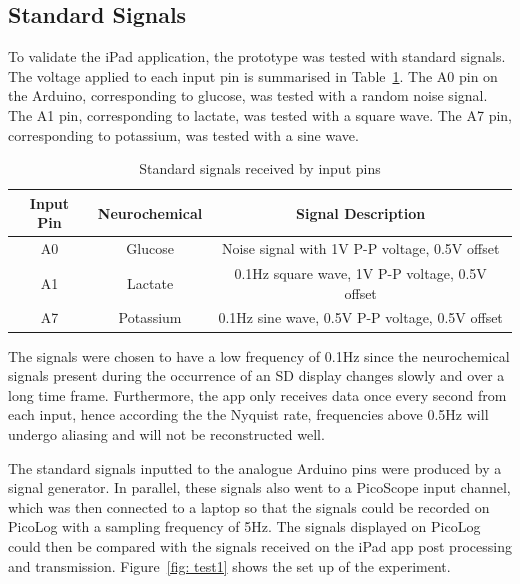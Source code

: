\subsection{Standard Signals}
To validate the iPad application, the prototype was tested with standard signals. The voltage applied to each input pin is summarised in Table~\ref{table: standard signals}. The A0 pin on the Arduino, corresponding to glucose, was tested with a random noise signal. The A1 pin, corresponding to lactate, was tested with a square wave. The A7 pin, corresponding to potassium, was tested with a sine wave. 

\begin{table}[h!]
\centering
\begin{tabular}{||c c c||} 
 \hline
 Input Pin & Neurochemical & Signal Description \\ [0.5ex] 
 \hline\hline
 A0 & Glucose & Noise signal with 1V P-P voltage, 0.5V offset \\
 A1 & Lactate & 0.1Hz square wave, 1V P-P voltage, 0.5V offset \\
 A7 & Potassium & 0.1Hz sine wave, 0.5V P-P voltage, 0.5V offset \\
 \hline
\end{tabular}
\caption{Standard signals received by input pins}
\label{table: standard signals}
\end{table}

The signals were chosen to have a low frequency of 0.1Hz since the neurochemical signals present during the occurrence of an SD display changes slowly and over a long time frame. Furthermore, the app only receives data once every second from each input, hence according the the Nyquist rate, frequencies above 0.5Hz will undergo aliasing and will not be reconstructed well.

The standard signals inputted to the analogue Arduino pins were produced by a signal generator. In parallel, these signals also went to a PicoScope input channel, which was then connected to a laptop so that the signals could be recorded on PicoLog with a sampling frequency of 5Hz. The signals displayed on PicoLog could then be compared with the signals received on the iPad app post processing and transmission. Figure~\ref{fig: test1} shows the set up of the experiment.

